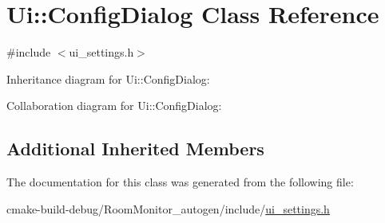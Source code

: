 \hypertarget{class_ui_1_1_config_dialog}{}\section{Ui\+:\+:Config\+Dialog Class Reference}
\label{class_ui_1_1_config_dialog}


{\ttfamily \#include $<$ui\+\_\+settings.\+h$>$}



Inheritance diagram for Ui\+:\+:Config\+Dialog\+:


Collaboration diagram for Ui\+:\+:Config\+Dialog\+:
\subsection*{Additional Inherited Members}


The documentation for this class was generated from the following file\+:\begin{DoxyCompactItemize}
\item 
cmake-\/build-\/debug/\+Room\+Monitor\+\_\+autogen/include/\hyperlink{ui__settings_8h}{ui\+\_\+settings.\+h}\end{DoxyCompactItemize}
